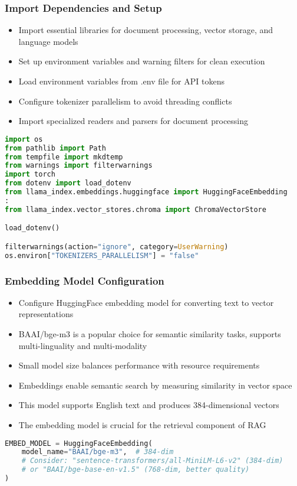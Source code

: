 \begin{frame}[fragile]\frametitle{Import Dependencies and Setup}
      \begin{itemize}
          \item Import essential libraries for document processing, vector storage, and language models
          \item Set up environment variables and warning filters for clean execution
          \item Load environment variables from .env file for API tokens
          \item Configure tokenizer parallelism to avoid threading conflicts
          \item Import specialized readers and parsers for document processing
      \end{itemize}
      
\begin{lstlisting}[language=Python, basicstyle=\tiny]
import os
from pathlib import Path
from tempfile import mkdtemp
from warnings import filterwarnings
import torch
from dotenv import load_dotenv
from llama_index.embeddings.huggingface import HuggingFaceEmbedding
:
from llama_index.vector_stores.chroma import ChromaVectorStore

load_dotenv()

filterwarnings(action="ignore", category=UserWarning)
os.environ["TOKENIZERS_PARALLELISM"] = "false"
\end{lstlisting}
\end{frame}

\begin{frame}[fragile]\frametitle{Embedding Model Configuration}
      \begin{itemize}
          \item Configure HuggingFace embedding model for converting text to vector representations
          \item BAAI/bge-m3 is a popular choice for semantic similarity tasks, supports multi-linguality and multi-modality
          \item Small model size balances performance with resource requirements
          \item Embeddings enable semantic search by measuring similarity in vector space
          \item This model supports English text and produces 384-dimensional vectors
          \item The embedding model is crucial for the retrieval component of RAG
      \end{itemize}
      
\begin{lstlisting}[language=Python, basicstyle=\tiny]
EMBED_MODEL = HuggingFaceEmbedding(
    model_name="BAAI/bge-m3",  # 384-dim
    # Consider: "sentence-transformers/all-MiniLM-L6-v2" (384-dim)
    # or "BAAI/bge-base-en-v1.5" (768-dim, better quality)
)
\end{lstlisting}
\end{frame}

